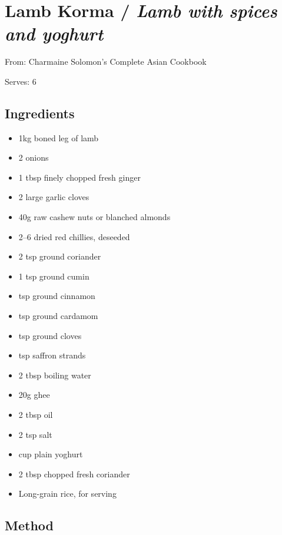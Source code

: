 \section{Lamb Korma / \emph{Lamb with spices and yoghurt}}


From: Charmaine Solomon's Complete Asian Cookbook

Serves: 6

\subsection{Ingredients}

\begin{itemize}
	\item 1kg boned leg of lamb
	\item 2 onions
	\item 1 tbsp finely chopped fresh ginger 
	\item 2 large garlic cloves 
	\item 40g raw cashew nuts or blanched almonds 
	\item 2–6 dried red chillies, deseeded 
	\item 2 tsp ground coriander 
	\item 1 tsp ground cumin 
	\item {} tsp ground cinnamon 
	\item {} tsp ground cardamom 
	\item {} tsp ground cloves 
	\item {} tsp saffron strands 
	\item 2 tbsp boiling water 
	\item 20g ghee 
	\item 2 tbsp oil 
	\item 2 tsp salt 
	\item {} cup plain yoghurt 
	\item 2 tbsp chopped fresh coriander
	\item Long-grain rice, for serving
\end{itemize}

\subsection{Method}

